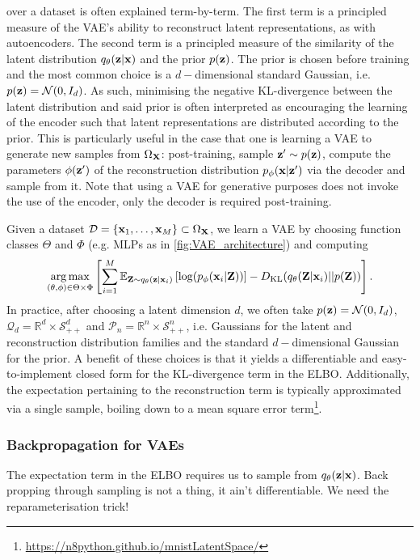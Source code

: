 \documentclass[11pt]{article}
\begin{document}
over a dataset is often explained term-by-term. The first term is a principled measure of the VAE's ability to reconstruct latent representations, as with autoencoders. The second term is a principled measure of the similarity of the latent distribution $q_{\theta}(\mathbf{z}|\mathbf{x})$ and the prior $p(\mathbf{z})$. The prior is chosen before training and the most common choice is a $d-$dimensional standard Gaussian, i.e. $p(\mathbf{z})=\mathcal{N}(0,I_d)$. As such, minimising the negative KL-divergence between the latent distribution and said prior is often interpreted as encouraging the learning of the encoder such that latent representations are distributed according to the prior. This is particularly useful in the case that one is learning a VAE to generate new samples from $\Omega_{\mathbf{X}}$: post-training, sample $\mathbf{z}'\sim p(\mathbf{z})$, compute the parameters $\phi(\mathbf{z}')$ of the reconstruction distribution $p_{\phi}(\mathbf{x}|\mathbf{z}')$ via the decoder and sample from it. Note that using a VAE for generative purposes does not invoke the use of the encoder, only the decoder is required post-training.

Given a dataset $\mathcal{D}=\{\mathbf{x}_1,\dots,\mathbf{x}_M\}\subset\Omega_{\mathbf{X}}$, we learn a VAE by choosing function classes $\Theta$ and $\Phi$ (e.g. MLPs as in \autoref{fig:VAE_architecture}) and computing
$$
\operatorname*{arg\,max}_{(\theta,\phi)\in\Theta\times\Phi}
\left[
\sum_{i=1}^M
\mathbb{E}_{\mathbf{Z}\sim q_{\theta}(\mathbf{z}|\mathbf{x}_i)}\left[\log(p_{\phi}(\mathbf{x}_i|\mathbf{Z}))\right]-D_{\text{KL}}(q_{\theta}(\mathbf{Z}|\mathbf{x}_i)||p(\mathbf{Z}))
\right].
$$
In practice, after choosing a latent dimension $d$, we often take $p(\mathbf{z})=\mathcal{N}(0,I_d)$, $\mathcal{Q}_d=\mathbb{R}^d\times\mathcal{S}_{++}^d$ and $\mathcal{P}_n=\mathbb{R}^n\times\mathcal{S}_{++}^n$, i.e. Gaussians for the latent and reconstruction distribution families and the standard $d-$dimensional Gaussian for the prior. A benefit of these choices is that it yields a differentiable and easy-to-implement closed form for the KL-divergence term in the ELBO. Additionally, the expectation pertaining to the reconstruction term is typically approximated via a single sample, boiling down to a mean square error term\footnote{\url{https://n8python.github.io/mnistLatentSpace/}}.

\subsubsection{Backpropagation for VAEs}
The expectation term in the ELBO requires us to sample from $q_{\theta}(\mathbf{z}|\mathbf{x})$. Back propping through sampling is not a thing, it ain't differentiable. We need the reparameterisation trick!
\end{document}
